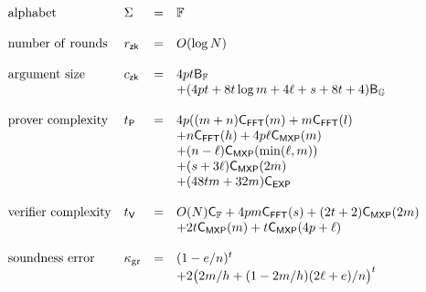 \begin{comment}
\section{Performance Evaluation}\label{sec:performancecompare}
We now summarize several performance parameters attained by our protocol for circuit
size $N$ and soundness $2^{-\secpar}$. Let $N=pms$, $\ell=s+t$ and $h$ be as in
previous sections. Let $\cfop$ denote the time taken for a field operation,
$\cfft(x)$ denote the time to compute $\fft$ of a length $x$ vector, $\cmexp(x)$
denote the time taken for a multiexponentiation of length $x$, and $\cexp$
denote the time required for an exponentiation. Let $\bitsF$ and $\bitsG$ denote
the number of bits required to represent an element of $\FF$ and $\GG$
respectively. Our protocol $\name$ achieves
following efficiency parameters:
>>>>>>> 23d366f2e2ed1d9aa1e813a97eaeee4f95db57a1
\end{comment}
{\footnotesize
\begin{align*}
\begin{array}{llrl}
\mathrm{alphabet} & \Sigma & = & \mathbb{F} \\
& & & \\
\mathrm{number\ of\ rounds} & r_\mathsf{zk} & = & O(\log{N}) \\
& & & \\
\mathrm{argument\ size} & c_\mathsf{zk} & = & 4pt\mathsf{B}_\mathbb{F} \\
& & & +(4pt+8t\log{m}+4\ell+s+8t+4)\mathsf{B}_\mathbb{G} \\
& & & \\
\mathrm{prover\ complexity} & t_{\mathsf{P}} & = &
4p((m+n)\mathsf{C}_\mathsf{FFT}(m)+m\mathsf{C}_\mathsf{FFT}(l) \\
& & &+n\mathsf{C}_\mathsf{FFT}(h) + 4p\ell\mathsf{C}_\mathsf{MXP}(m)\\
& & &+(n-\ell)\mathsf{C}_\mathsf{MXP}(\min(\ell,m))\\
& & & +(s+3\ell)\mathsf{C}_\mathsf{MXP}(2m)\\
& & &+ (48tm+32m)\mathsf{C}_\mathsf{EXP} \\
& & & \\
\mathrm{verifier\ complexity} & t_{\mathsf{V}} & = &
O(N)\mathsf{C}_\mathbb{F} + 4pm\mathsf{C}_\mathsf{FFT}(s)+(2t+2)\mathsf{C}_\mathsf{MXP}(2m)\\
& & & +2t\mathsf{C}_\mathsf{MXP}(m)+t\mathsf{C}_\mathsf{MXP}(4p+\ell) \\
& & & \\
\mathrm{soundness\ error} & \kappa_{\rm gr} & = & (1-e/n)^t \\ 
& & & +2\big(2m/h+(1-2m/h)(2\ell+e)/n\big)^t 
\end{array}
\end{align*}
}

